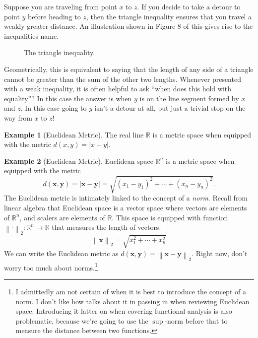 \documentclass{article}
\newcommand{\R}{\mathbb{R}}
\newcommand{\x}{\mathbf{x}}
\newcommand{\y}{\mathbf{y}}
\newcommand{\norm}[1]{\left\lVert#1\right\rVert}
\theoremstyle{definition}
\newtheorem{example}{Example}[section]
\begin{document}
Suppose you are traveling from point $ x $ to $ z $. If you decide to take a detour to point $ y $ before heading to $ z $, then the triangle inequality ensures that you travel a weakly greater distance. An illustration shown in Figure 8 of this gives rise to the inequalities name.
\begin{figure}[h!]
	\centering
	\caption{The triangle inequality.}
\end{figure}  
Geometrically, this is equivalent to saying that the length of any side of a triangle cannot be greater than the sum of the other two lengths. Whenever presented with a weak inequality, it is often helpful to ask ``when does this hold with equality''? In this case the answer is when $ y $ is on the line segment formed by $ x $ and $ z $. In this case going to $ y $ isn't a detour at all, but just a trivial stop on the way from $ x $ to $ z $! 
\begin{example}[Euclidean Metric]
The real line $ \R $ is a metric space when equipped with the metric $ d(x,y)=|x-y| $. 
\end{example}
\begin{example}[Euclidean Metric]
Euclidean space $ \R^n $ is a metric space when equipped with the metric $$ d(\mathbf{x},\mathbf{y})=|\x-\y|=\sqrt{(x_1-y_1)^2+\cdots+(x_n-y_n)^2} .$$  The Euclidean metric is intimately linked to the concept of a \textit{\color{red}norm}. Recall from linear algebra that Euclidean space is a vector space where vectors are elements of $ \R^n $, and scalers are elements of $ \R $. This space is equipped with function $ \norm{\cdot}_2:\R^n\to\R $ that measures the length of vectors. $$ \norm{\x}_2=\sqrt{x_1^2+\cdots+x_n^2}$$ We can write the Euclidean metric as $ d(\x,\y)=\norm{\x-\y}_2 $. Right now, don't worry too much about norms.\footnote{I admittedly am not certain of when it is best to introduce the concept of a norm. I don't like how \cite{rudin1964principles} talks about it in passing in when reviewing Euclidean space. Introducing it latter on when covering functional analysis is also problematic, because we're going to use the $ \sup $-norm before that to measure the distance between two functions.} 
\end{example}
\end{document}
